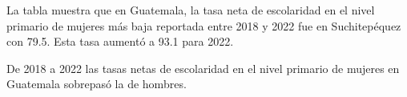 La tabla muestra que en Guatemala, la tasa neta de escolaridad en el nivel primario de mujeres más baja reportada entre 2018 y 2022 fue en Suchitepéquez con 79.5. Esta tasa aumentó a 93.1 para 2022.

De 2018 a 2022 las tasas netas de escolaridad en el nivel primario de mujeres en Guatemala sobrepasó la de hombres. 